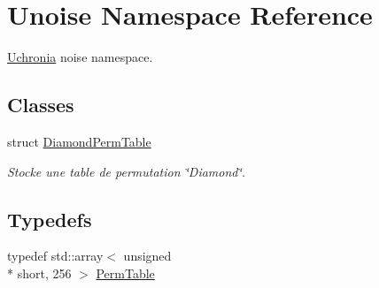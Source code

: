 \hypertarget{namespace_unoise}{\section{Unoise Namespace Reference}
\label{namespace_unoise}
}


\hyperlink{namespace_uchronia}{Uchronia} noise namespace.  


\subsection*{Classes}
\begin{DoxyCompactItemize}
\item 
struct \hyperlink{struct_unoise_1_1_diamond_perm_table}{Diamond\-Perm\-Table}
\begin{DoxyCompactList}\small\item\em Stocke une table de permutation \char`\"{}\-Diamond\char`\"{}. \end{DoxyCompactList}\end{DoxyCompactItemize}
\subsection*{Typedefs}
\begin{DoxyCompactItemize}
\item 
typedef std\-::array$<$ unsigned \\*
short, 256 $>$ \hyperlink{namespace_unoise_ae11142038f2dd1bea2711b2b99bbfaf6}{Perm\-Table}
\end{DoxyCompactItemize}
